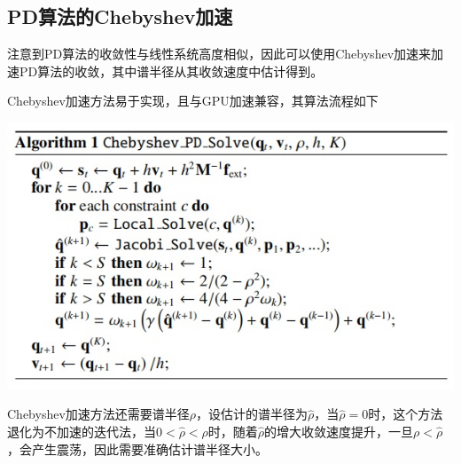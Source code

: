 \documentclass{CLGPY}
\begin{document}
\begin{multicols}{2}
		\section{PD算法的Chebyshev加速\textsuperscript{\cite{4}}}

		注意到PD算法的收敛性与线性系统高度相似，因此可以使用Chebyshev加速来加速PD算法的收敛，其中谱半径从其收敛速度中估计得到。

		Chebyshev加速方法易于实现，且与GPU加速兼容，其算法流程如下
        \begin{center}
            \includegraphics[width=1.0\linewidth]{./fig/chebyshev.jpg}
        \end{center}

		Chebyshev加速方法还需要谱半径$\rho$，设估计的谱半径为$\hat \rho$，当$\hat \rho = 0$时，这个方法退化为不加速的迭代法，当$0 < \hat \rho < \rho$时，随着$\hat \rho$的增大收敛速度提升，一旦$\rho < \hat \rho$，会产生震荡，因此需要准确估计谱半径大小。


\end{multicols}
\end{document}
